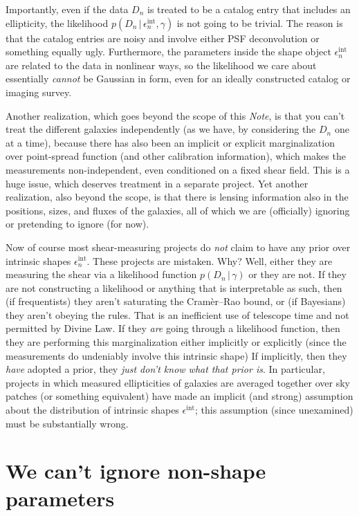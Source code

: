 \documentclass[12pt]{article}
\newcommand{\documentname}{\textsl{Note}}
\newcommand{\given}{\,|\,}
\newcommand{\data}{D}
\newcommand{\shear}{\gamma}
\newcommand{\ellip}{\epsilon}
\newcommand{\intrinsic}{\ellip^{\mathrm{int}}}
\begin{document}
Importantly, even if the data $\data_n$ is treated to be a catalog entry that includes an ellipticity,
  the likelihood $p(\data_n\given\intrinsic_n,\shear)$ is not going to be trivial.
The reason is that the catalog entries are noisy and involve either PSF deconvolution or something equally ugly.
Furthermore, the parameters inside the shape object $\intrinsic_n$ are related to the data in nonlinear ways,
  so the likelihood we care about essentially \emph{cannot} be Gaussian in form,
  even for an ideally constructed catalog or imaging survey.

Another realization, which goes beyond the scope of this \documentname,
  is that you can't treat the different galaxies independently
  (as we have, by considering the $\data_n$ one at a time),
  because there has also been an implicit or explicit marginalization over point-spread function
  (and other calibration information),
  which makes the measurements non-independent, even conditioned on a fixed shear field.
This is a huge issue, which deserves treatment in a separate project.
Yet another realization, also beyond the scope,
  is that there is lensing information also in the positions, sizes, and fluxes
  of the galaxies,
  all of which we are (officially) ignoring or pretending to ignore (for now).

Now of course most shear-measuring projects do \emph{not} claim to have any prior over intrinsic shapes $\intrinsic_n$.
These projects are mistaken.  Why?
Well, either they are measuring the shear via a likelihood function $p(\data_n\given\shear)$ or they are not.
If they are not constructing a likelihood or anything that is interpretable as such,
  then (if frequentists) they aren't saturating the Cram\`er--Rao bound,
  or (if Bayesians) they aren't obeying the rules.
That is an inefficient use of telescope time and not permitted by Divine Law.
If they \emph{are} going through a likelihood function,
  then they are performing this marginalization either implicitly or explicitly
  (since the measurements do undeniably involve this intrinsic shape)
If implicitly, then they \emph{have} adopted a prior, they \emph{just don't know what that prior is}.
In particular, projects in which
  measured ellipticities of galaxies are averaged together over sky patches
  (or something equivalent)
  have made an implicit (and strong) assumption about the distribution of intrinsic shapes $\intrinsic$;
  this assumption (since unexamined) must be substantially wrong.

\section{We can't ignore non-shape parameters}
\end{document}

